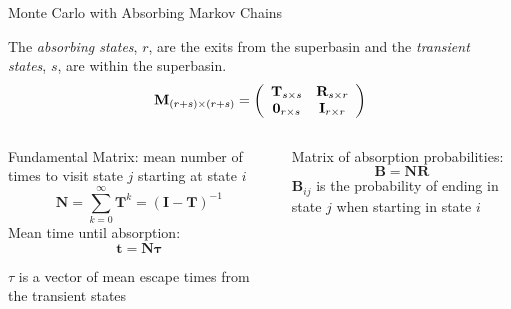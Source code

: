 \documentclass[onlymath]{beamer}
\begin{document}
\begin{frame}{Monte Carlo with Absorbing Markov Chains}

  The \emph{absorbing
  states}, $r$, are the exits from the superbasin and the \emph{transient
  states}, $s$, are within the superbasin. 
  \begin{equation*}
    \mathbf{M}_{(r+s) \times (r+s)} = 
    \left(
      \begin{array}{ c c }
        \mathbf{T}_{s\times s} & \mathbf{R}_{s\times r} \\
        \mathbf{0}_{r\times s} & \mathbf{I}_{r\times r} 
      \end{array}
    \right)
  \end{equation*}

  \vspace{3 mm}

  \begin{columns}[t]
    \begin{column}[l]{0.5\textwidth}
      Fundamental Matrix: mean number of times to visit state $j$ starting at state $i$
                  \vspace{-2mm}
      \begin{equation*}
        \mathbf{N}=\sum_{k=0}^\infty \mathbf{T}^k= {(\mathbf{I}-\mathbf{T})}^{-1} 
      \end{equation*}
      Mean time until absorption:
            \vspace{-2mm}
      \begin{equation*}
        \mathbf{t} = \mathbf{N} \mathbf{\tau} 
      \end{equation*}

      {$\tau$ is a vector of mean escape times from the transient states}
    \end{column}

    \begin{column}[r]{0.5\textwidth}
      Matrix of absorption probabilities:
      \begin{equation*}
        \mathbf{B}=\mathbf{N} \mathbf{R} 
      \end{equation*}
      $\mathbf{B}_{ij}$ is the probability of ending in state $j$ when starting in state $i$ 
    \end{column}
  \end{columns}

\end{frame}
\end{document}
